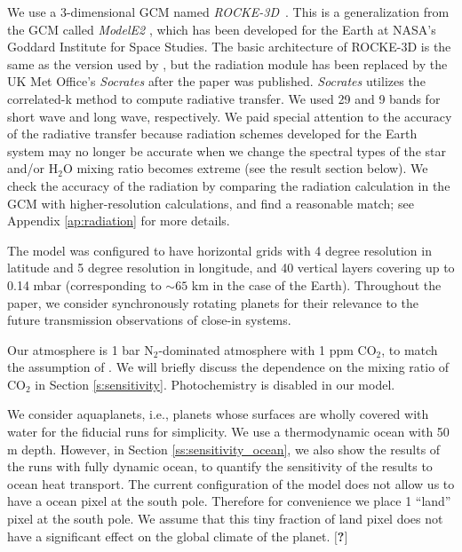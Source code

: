 \documentclass[11pt,numberedappendix,twocolappendix,]{emulateapj}
\def\water{H$_2$O }
\def\modelE{{\it ROCKE-3D}}
\def\memo#1{\color{red}$[${\bf #1}$]$ \color{black}}
\begin{document}
We use a 3-dimensional GCM named \modelE \ \citep{Way2017}. 
This is a generalization from the GCM called {\it ModelE2} \citep{Schmidt2014}, which has been developed for the Earth at NASA's Goddard Institute for Space Studies. 
The basic architecture of ROCKE-3D is the same as the version used by \citet{Way2016}, but the radiation module has been replaced by the UK Met Office's {\it Socrates} \citep{Edwards1996} after the paper was published. 
{\it Socrates} utilizes the correlated-k method to compute radiative transfer. 
We used 29 and 9 bands for short wave and long wave, respectively. 
We paid special attention to the accuracy of the radiative transfer because radiation schemes developed for the Earth system may no longer be accurate when we change the spectral types of the star and/or \water mixing ratio becomes extreme (see the result section below). 
We check the accuracy of the radiation by comparing the radiation calculation in the GCM with higher-resolution calculations, and find a reasonable match;  see Appendix \ref{ap:radiation} for more details. 

The model was configured to have horizontal grids with 4 degree resolution in latitude and 5 degree resolution in longitude, and 40 vertical layers covering up to 0.14 mbar (corresponding to $\sim 65$ km in the case of the Earth). 
Throughout the paper, we consider synchronously rotating planets for their  relevance to the future transmission observations of close-in systems. 

Our atmosphere is 1 bar N$_2$-dominated atmosphere with 1 ppm CO$_2$, to match the assumption of \citet{Kopparapu2016}. 
We will briefly discuss the dependence on the mixing ratio of CO$_2$ in Section \ref{s:sensitivity}. 
Photochemistry is disabled in our model. 

We consider aquaplanets, i.e., planets whose surfaces are wholly covered with water for the fiducial runs for simplicity. 
We use a thermodynamic ocean with 50 m depth. 
However, in Section \ref{ss:sensitivity_ocean}, we also show the results of the runs with fully dynamic ocean, to quantify the sensitivity of the results to ocean heat transport. 
The current configuration of the model does not allow us to have a ocean pixel at the south pole. Therefore for convenience we place 1 ``land'' pixel at the south pole. We assume that this tiny fraction of land pixel does not have a significant effect on the global climate of the planet. \memo{?}


\end{document}

